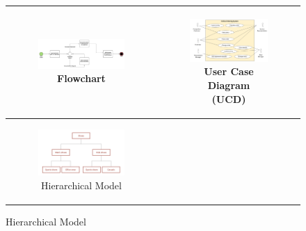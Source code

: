 \begin{figure}[ht]
    \centering
	\begin{tabular}{|c|c|}
		\hline
		\begin{subfigure}[b]{0.44\textwidth}
			\centering
			\includegraphics[width=0.9\linewidth]{mainmatter/images/exampleflowchart.jpeg}
			\caption{Flowchart}
         	\label{fig:myfig35}
		\end{subfigure} & 
		\begin{subfigure}[b]{0.44\textwidth}
			\centering
			\vspace{0.2cm}
			\includegraphics[width=0.7\linewidth]{mainmatter/images/exampleucd.png}
			\caption{User Case Diagram (UCD)}
         	\label{fig:myfig36}
		\end{subfigure}	\\
		\hline
		\begin{subfigure}[b]{0.44\textwidth}
			\centering
			\includegraphics[width=0.8\linewidth]{mainmatter/images/examplehmodel.png}
			\caption{Hierarchical Model}
         	\label{fig:myfig37}
		\end{subfigure} & 

\end{tabular}
\end{figure}
